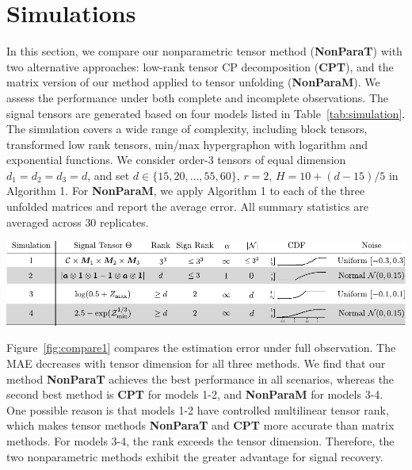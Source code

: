 \documentclass[useAMS,usenatbib,usegraphicx,referee]{biom}
\theoremstyle{plain}
\theoremstyle{definition}
\begin{document}
\section{Simulations}\label{sec:simulation}
In this section, we compare our nonparametric tensor method ({\bf NonParaT}) with two alternative approaches: low-rank tensor CP decomposition ({\bf CPT}), and the matrix version of our method applied to tensor unfolding ({\bf NonParaM}). We assess the performance under both complete and incomplete observations. The signal tensors are generated based on four models listed in Table~\ref{tab:simulation}. The simulation covers a wide range of complexity, including block tensors, transformed low rank tensors, min/max hypergraphon with logarithm and exponential functions. We consider order-3  tensors of equal dimension $d_1=d_2=d_3=d$, and set $d\in \{15, 20,\ldots,55,60\}$, $r=2$, $H=10+{(d-15)/ 5}$ in Algorithm 1. For {\bf NonParaM}, we apply Algorithm 1 to each of the three unfolded matrices and report the average error. All summary statistics are averaged across $30$ replicates.  

\begin{table}[h]
\includegraphics[width=1\textwidth]{figure/simulation.pdf}
 \captionsetup{justification=raggedright,font=small}
\caption{Simulation models used for comparison. We use $\mM_k\in\{0,1\}^{d\times 3}$ to denote membership matrices, $\tC\in\mathbb{R}^{3\times 3\times 3}$ the block means, $\ma={1\over d}(1,2,\ldots,d)^T \in\mathbb{R}^d$, $\tZ_{\max}$ and $\tZ_{\min}$ are order-3 tensors with entries ${1\over d}\max(i,j,k)$ and ${1\over d}\min(i,j,k)$, respectively.}\label{tab:simulation}
\end{table}
\vspace{-.5cm}

Figure~\ref{fig:compare1} compares the estimation error under full observation. The MAE decreases with tensor dimension for all three methods. We find that our method {\bf NonParaT} achieves the best performance in all scenarios, whereas the second best method is {\bf CPT} for models 1-2, and {\bf NonParaM} for models 3-4. One possible reason is that models 1-2 have controlled multilinear tensor rank, which makes tensor methods {\bf NonParaT} and {\bf CPT} more accurate than matrix methods. For models 3-4, the rank exceeds the tensor dimension. Therefore, the two nonparametric methods  exhibit the greater advantage for signal recovery. 
\end{document}
